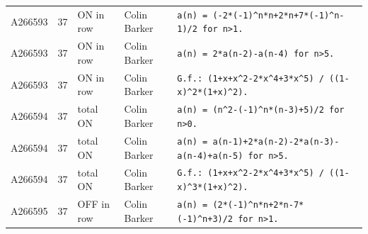 \documentclass[11pt]{article}
\theoremstyle{definition}
\theoremstyle{remark}
\begin{document}
{\begin{longtable}{p{1.3cm}p{0.7cm}p{2.4cm}p{2.3cm}p{7.3cm}}
A266593 & 37 & ON in row & Colin Barker & \texttt{a(n)\allowbreak{} \allowbreak{}=\allowbreak{} \allowbreak{}(-\allowbreak{}2*\allowbreak{}(-\allowbreak{}1)\allowbreak{}\^{}n*\allowbreak{}n+\allowbreak{}2*\allowbreak{}n+\allowbreak{}7*\allowbreak{}(-\allowbreak{}1)\allowbreak{}\^{}n-\allowbreak{}1)\allowbreak{}/\allowbreak{}2 \allowbreak{}for \allowbreak{}n>1.} \\
A266593 & 37 & ON in row & Colin Barker & \texttt{a(n)\allowbreak{} \allowbreak{}=\allowbreak{} \allowbreak{}2*\allowbreak{}a(n-\allowbreak{}2)\allowbreak{}-\allowbreak{}a(n-\allowbreak{}4)\allowbreak{} \allowbreak{}for \allowbreak{}n>5.} \\
A266593 & 37 & ON in row & Colin Barker & \texttt{G.f.: \allowbreak{}(1+\allowbreak{}x+\allowbreak{}x\^{}2-\allowbreak{}2*\allowbreak{}x\^{}4+\allowbreak{}3*\allowbreak{}x\^{}5)\allowbreak{} \allowbreak{}/\allowbreak{} \allowbreak{}((1-\allowbreak{}x)\allowbreak{}\^{}2*\allowbreak{}(1+\allowbreak{}x)\allowbreak{}\^{}2)\allowbreak{}.} \\
A266594 & 37 & total ON & Colin Barker & \texttt{a(n)\allowbreak{} \allowbreak{}=\allowbreak{} \allowbreak{}(n\^{}2-\allowbreak{}(-\allowbreak{}1)\allowbreak{}\^{}n*\allowbreak{}(n-\allowbreak{}3)\allowbreak{}+\allowbreak{}5)\allowbreak{}/\allowbreak{}2 \allowbreak{}for \allowbreak{}n>0.} \\
A266594 & 37 & total ON & Colin Barker & \texttt{a(n)\allowbreak{} \allowbreak{}=\allowbreak{} \allowbreak{}a(n-\allowbreak{}1)\allowbreak{}+\allowbreak{}2*\allowbreak{}a(n-\allowbreak{}2)\allowbreak{}-\allowbreak{}2*\allowbreak{}a(n-\allowbreak{}3)\allowbreak{}-\allowbreak{}a(n-\allowbreak{}4)\allowbreak{}+\allowbreak{}a(n-\allowbreak{}5)\allowbreak{} \allowbreak{}for \allowbreak{}n>5.} \\
A266594 & 37 & total ON & Colin Barker & \texttt{G.f.: \allowbreak{}(1+\allowbreak{}x+\allowbreak{}x\^{}2-\allowbreak{}2*\allowbreak{}x\^{}4+\allowbreak{}3*\allowbreak{}x\^{}5)\allowbreak{} \allowbreak{}/\allowbreak{} \allowbreak{}((1-\allowbreak{}x)\allowbreak{}\^{}3*\allowbreak{}(1+\allowbreak{}x)\allowbreak{}\^{}2)\allowbreak{}.} \\
A266595 & 37 & OFF in row & Colin Barker & \texttt{a(n)\allowbreak{} \allowbreak{}=\allowbreak{} \allowbreak{}(2*\allowbreak{}(-\allowbreak{}1)\allowbreak{}\^{}n*\allowbreak{}n+\allowbreak{}2*\allowbreak{}n-\allowbreak{}7*\allowbreak{}(-\allowbreak{}1)\allowbreak{}\^{}n+\allowbreak{}3)\allowbreak{}/\allowbreak{}2 \allowbreak{}for \allowbreak{}n>1.} \\

\end{longtable}}
\end{document}
